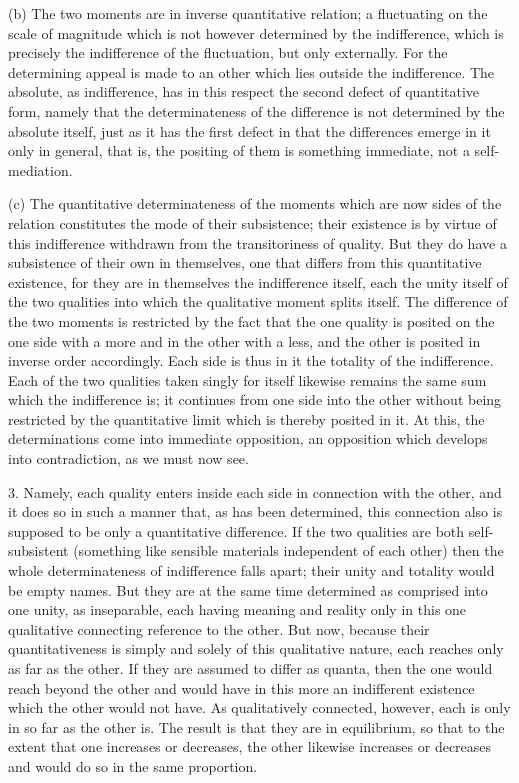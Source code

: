 (b) The two moments are in inverse quantitative relation;
a fluctuating on the scale of magnitude
which is not however determined by the indifference,
which is precisely the indifference of the fluctuation,
but only externally.
For the determining appeal is made to an other
which lies outside the indifference.
The absolute, as indifference, has in this respect
the second defect of quantitative form,
namely that the determinateness of the difference is
not determined by the absolute itself,
just as it has the first defect in that
the differences emerge in it only in general, that is,
the positing of them is something immediate,
not a self-mediation.

(c) The quantitative determinateness of the moments which are now
sides of the relation constitutes the mode of their subsistence;
their existence is by virtue of this indifference
withdrawn from the transitoriness of quality.
But they do have a subsistence of their own in themselves,
one that differs from this quantitative existence,
for they are in themselves the indifference itself,
each the unity itself of the two qualities
into which the qualitative moment splits itself.
The difference of the two moments is restricted by
the fact that the one quality is posited
on the one side with a more
and in the other with a less,
and the other is posited
in inverse order accordingly.
Each side is thus in it the totality of the indifference.
Each of the two qualities taken singly for itself
likewise remains the same sum which the indifference is;
it continues from one side into the other
without being restricted by the quantitative limit
which is thereby posited in it.
At this, the determinations come into immediate opposition,
an opposition which develops into contradiction,
as we must now see.

3. Namely, each quality enters inside
each side in connection with the other,
and it does so in such a manner that, as has been determined,
this connection also is supposed to be only a quantitative difference.
If the two qualities are both self-subsistent
(something like sensible materials independent of each other)
then the whole determinateness of indifference falls apart;
their unity and totality would be empty names.
But they are at the same time determined as
comprised into one unity, as inseparable,
each having meaning and reality only in this one
qualitative connecting reference to the other.
But now, because their quantitativeness is simply
and solely of this qualitative nature,
 each reaches only as far as the other.
If they are assumed to differ as quanta,
then the one would reach beyond the other
and would have in this more an indifferent existence
which the other would not have.
As qualitatively connected, however,
each is only in so far as the other is.
The result is that they are in equilibrium,
so that to the extent that one increases or decreases,
the other likewise increases or decreases
and would do so in the same proportion.

